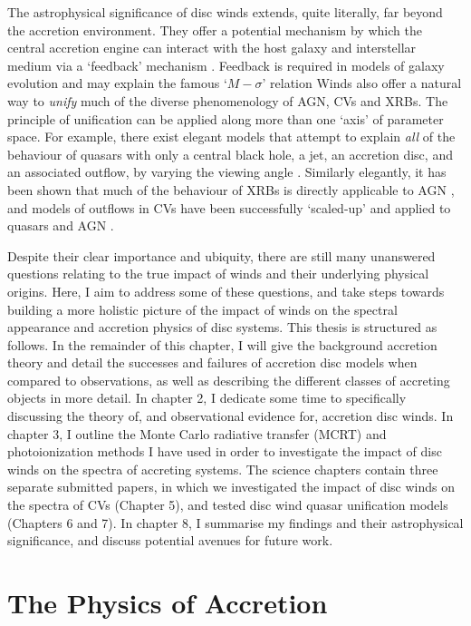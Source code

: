 The astrophysical significance of disc winds extends, quite literally, 
far beyond the accretion environment. They offer a potential mechanism by which the central
accretion engine can interact with the host galaxy and interstellar medium 
via a `feedback' mechanism \citep{king2003,fabian2012}. 
Feedback is required in models of 
galaxy evolution \citep{springel2005}
and may explain the famous `$M-\sigma$' relation \citep{silkrees1998,haring2004} 
Winds also offer a natural way to {\em unify} much
of the diverse phenomenology of AGN, CVs and XRBs. The principle of unification
can be applied along more than one `axis' of parameter space. For example, 
there exist elegant models that attempt to explain {\em all}
of the behaviour of quasars with only a central black hole, a jet, an accretion disc,
and an associated outflow, by varying the viewing angle \citep{elvis2000}.
Similarly elegantly, it has been shown that much of the behaviour of XRBs
is directly applicable to AGN \citep{mchardy2006}, 
and models of outflows in CVs have been successfully `scaled-up'
and applied to quasars and AGN \citep[e.g.][]{higginbottom2013}.

Despite their clear importance and ubiquity, there are still
many unanswered questions relating to the true impact of winds and their underlying
physical origins. Here, I aim to address some of these questions, and 
take steps towards building a more holistic picture of the impact
of winds on the spectral appearance and accretion physics of disc systems.
This thesis is structured as follows. In the remainder of this chapter, 
I will give the background accretion theory 
and detail the successes and failures of accretion disc models when compared to observations,
as well as describing the different classes of accreting objects in more detail. 
In chapter 2, I dedicate some time to specifically discussing the theory of,
and observational evidence for, accretion disc winds. In chapter 3, I outline 
the Monte Carlo radiative transfer (MCRT) and photoionization
methods I have used in order to investigate the impact of disc 
winds on the spectra of accreting systems. The science chapters
contain three separate submitted papers, in which we investigated the impact
of disc winds on the spectra of CVs (Chapter 5), and tested disc wind
quasar unification models (Chapters 6 and 7).
In chapter 8, I summarise my findings and their astrophysical significance, 
and discuss potential avenues for future work.


\section{The Physics of Accretion}

